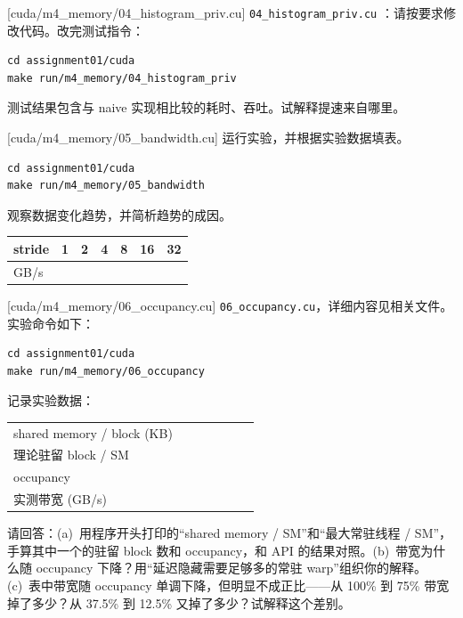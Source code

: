 \documentclass[11pt,a4paper,fontset=none]{ctexart}
\begin{document}
[cuda/m4\_memory/04\_histogram\_priv.cu]
\texttt{04\_histogram\_priv.cu} ：请按要求修改代码。改完测试指令：

\begin{lstlisting}
cd assignment01/cuda
make run/m4_memory/04_histogram_priv
\end{lstlisting}

测试结果包含与 naive 实现相比较的耗时、吞吐。试解释提速来自哪里。

[cuda/m4\_memory/05\_bandwidth.cu]
运行实验，并根据实验数据填表。

\begin{lstlisting}
cd assignment01/cuda
make run/m4_memory/05_bandwidth
\end{lstlisting}

观察数据变化趋势，并简析趋势的成因。

\begin{center}\small
\begin{tabular}{@{}lcccccc@{}}
\toprule
stride & 1 & 2 & 4 & 8 & 16 & 32 \\
\midrule
GB/s & & & & & & \\
\bottomrule
\end{tabular}
\end{center}

[cuda/m4\_memory/06\_occupancy.cu]
\texttt{06\_occupancy.cu}，详细内容见相关文件。实验命令如下：

\begin{lstlisting}
cd assignment01/cuda
make run/m4_memory/06_occupancy
\end{lstlisting}

记录实验数据：

\begin{center}\small
\begin{tabular}{@{}lcccccc@{}}
\toprule
shared memory / block (KB) & & & & & & \\
理论驻留 block / SM & & & & & & \\
occupancy & & & & & & \\
实测带宽 (GB/s) & & & & & & \\
\bottomrule
\end{tabular}
\end{center}

请回答：(a)~用程序开头打印的“shared memory / SM”和“最大常驻线程 / SM”，手算其中一个的驻留 block 数和 occupancy，和 API 的结果对照。(b)~带宽为什么随 occupancy 下降？用“延迟隐藏需要足够多的常驻 warp”组织你的解释。(c)~表中带宽随 occupancy 单调下降，但明显不成正比——从 100\% 到 75\% 带宽掉了多少？从 37.5\% 到 12.5\% 又掉了多少？试解释这个差别。
\end{document}

